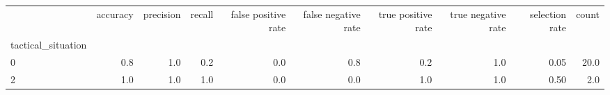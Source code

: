 \begin{tabular}{lrrrrrrrrr}
\toprule
{} &  accuracy &  precision &  recall &  false positive rate &  false negative rate &  true positive rate &  true negative rate &  selection rate &  count \\
tactical\_situation &           &            &         &                      &                      &                     &                     &                 &        \\
\midrule
0                  &       0.8 &        1.0 &     0.2 &                  0.0 &                  0.8 &                 0.2 &                 1.0 &            0.05 &   20.0 \\
2                  &       1.0 &        1.0 &     1.0 &                  0.0 &                  0.0 &                 1.0 &                 1.0 &            0.50 &    2.0 \\
\bottomrule
\end{tabular}
